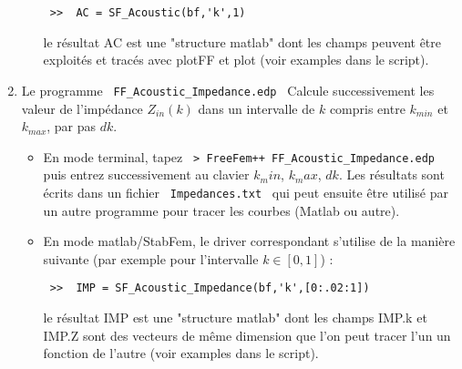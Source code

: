 \documentclass[11pt,a4paper]{article}
\begin{document}
\begin{enumerate}
\begin{itemize}
\verb| >>  AC = SF_Acoustic(bf,'k',1) |

le résultat AC est une "structure matlab" dont les champs peuvent être exploités et tracés avec plotFF et plot (voir examples dans le script).

\end{itemize}
 
 \item Le programme \verb| FF_Acoustic_Impedance.edp | Calcule successivement les valeur de l'impédance $Z_{in}(k)$ dans un intervalle de $k$ compris entre $k_{min}$ et $k_{max}$, par pas $dk$. 
 
\begin{itemize}
\item En mode terminal,  tapez \verb| > FreeFem++ FF_Acoustic_Impedance.edp | puis entrez successivement au clavier $k_min$, $k_max$, $dk$. Les résultats sont écrits dans un fichier \verb| Impedances.txt | qui peut ensuite être utilisé par un autre programme pour tracer les courbes (Matlab ou autre).

\item En mode matlab/StabFem, le driver correspondant s'utilise de la manière suivante (par exemple pour l'intervalle $k \in [0,1]$) :

\verb| >>  IMP = SF_Acoustic_Impedance(bf,'k',[0:.02:1]) |

le résultat IMP est une "structure matlab" dont les champs IMP.k et IMP.Z sont des vecteurs de même dimension que l'on peut tracer l'un un fonction de l'autre (voir examples dans le script).
  
\end{itemize}

\end{enumerate}
  
%
%
%
%
%
% 
%
%
% 
% 
% 
\end{document}
